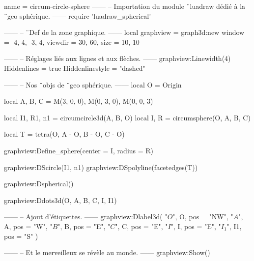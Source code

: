 \documentclass{standalone}
\begin{document}
\begin{luadraw}{name = circum-circle-sphere}
------
-- Importation du module ¨luadraw dédié à la ¨geo sphérique.
------
require 'luadraw_spherical'

------
-- ¨Def de la zone graphique.
------
local graphview = graph3d:new{
  window  = {-4, 4, -3, 4},
  viewdir = {30, 60},
  size    = {10, 10}
}

------
-- Réglages liés aux lignes et aux flèches.
------
graphview:Linewidth(4)
Hiddenlines     = true
Hiddenlinestyle = "dashed"

------
-- Nos ¨objs de ¨geo sphérique.
------
local O = Origin

local A, B, C = M(3, 0, 0), M(0, 3, 0), M(0, 0, 3)

local I1, R1, n1 = circumcircle3d(A, B, O)
local I, R       = circumsphere(O, A, B, C)

local T = tetra(O, A - O, B - O, C - O)

graphview:Define_sphere({center = I, radius = R})

graphview:DScircle({I1, n1})
graphview:DSpolyline(facetedges(T))

graphview:Dspherical()

graphview:Ddots3d({O, A, B, C, I, I1})

------
-- Ajout d'étiquettes.
------
graphview:Dlabel3d(
  "$O$", O, {pos = "NW"},
  "$A$", A, {pos = "W"},
  "$B$", B, {pos = "E"},
  "$C$", C, {pos = "E"},
  "$I$", I, {pos = "E"},
  "$I_1$", I1, {pos = "S"}
)

------
-- Et le merveilleux se révèle au monde.
------
graphview:Show()
\end{luadraw}
\end{document}
